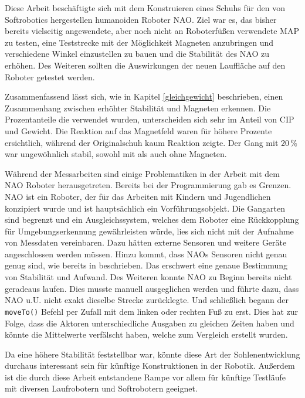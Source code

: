 Diese Arbeit beschäftigte sich mit dem Konstruieren eines Schuhs für den von Softrobotics hergestellen humanoiden Roboter NAO. Ziel war es, das bisher bereits vielseitig angewendete, aber noch nicht an Roboterfüßen verwendete MAP zu testen, eine Teststrecke mit der Möglichkeit Magneten anzubringen und verschiedene Winkel einzustellen zu bauen und die Stabilität des NAO zu erhöhen. Des Weiteren sollten die Auswirkungen der neuen Lauffläche auf den Roboter getestet werden. 

Zusammenfassend lässt sich, wie in Kapitel \ref{gleichgewicht} beschrieben, einen Zusammenhang zwischen erhöhter Stabilität und Magneten erkennen. Die Prozentanteile die verwendet wurden, unterscheiden sich sehr im Anteil von CIP und Gewicht. Die Reaktion auf das Magnetfeld waren für höhere Prozente ersichtlich, während der Originalschuh kaum Reaktion zeigte. Der Gang mit $20\,\%$ war ungewöhnlich stabil, sowohl mit als auch ohne Magneten. 

Während der Messarbeiten sind einige Problematiken in der Arbeit mit dem NAO Roboter herausgetreten. Bereits bei der Programmierung gab es Grenzen. NAO ist ein Roboter, der für das Arbeiten mit Kindern und Jugendlichen konzipiert wurde und ist hauptsächlich ein Vorführungsobjekt. Die Gangarten sind begrenzt und ein Ausgleichssystem, welches dem Roboter eine Rückkopplung für Umgebungserkennung gewährleisten würde, lies sich nicht mit der Aufnahme von Messdaten vereinbaren. Dazu hätten externe Sensoren und weitere Geräte angeschlossen werden müssen. Hinzu kommt, dass NAOs Sensoren nicht genau genug sind, wie bereits in \cite{pressure_shoe} beschrieben. Das erschwert eine genaue Bestimmung von Stabilität und Aufwand. Des Weiteren konnte NAO zu Beginn bereits nicht geradeaus laufen. Dies musste manuell ausgeglichen werden und führte dazu, dass NAO u.U. nicht exakt dieselbe Strecke zurücklegte. Und schließlich begann der \texttt{moveTo()} Befehl per Zufall mit dem linken oder rechten Fuß zu erst. Dies hat zur Folge, dass die Aktoren unterschiedliche Ausgaben zu gleichen Zeiten haben und könnte die Mittelwerte verfälscht haben, welche zum Vergleich erstellt wurden. 

Da eine höhere Stabilität feststellbar war, könnte diese Art der Sohlenentwicklung durchaus interessant sein für künftige Konstruktionen in der Robotik. Außerdem ist die durch diese Arbeit entstandene Rampe vor allem für künftige Testläufe mit diversen Laufrobotern und Softrobotern geeignet. 

